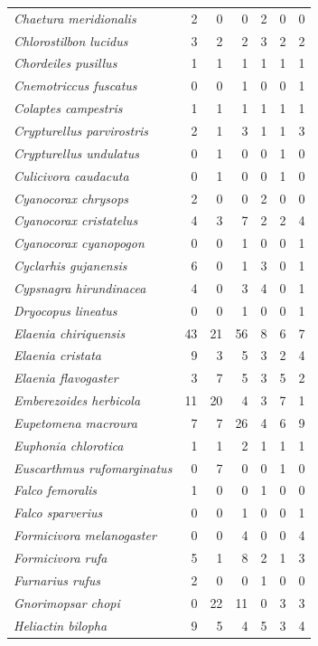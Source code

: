 \documentclass[12pt, A4]{article}
\begin{document}
\begin{longtable}{>{\itshape}lrrrrrr}
    Chaetura meridionalis & 2 & 0 & 0 & 2 & 0 & 0 \\ 
    Chlorostilbon lucidus & 3 & 2 & 2 & 3 & 2 & 2 \\ 
    Chordeiles pusillus & 1 & 1 & 1 & 1 & 1 & 1 \\ 
    Cnemotriccus fuscatus & 0 & 0 & 1 & 0 & 0 & 1 \\ 
    Colaptes campestris & 1 & 1 & 1 & 1 & 1 & 1 \\ 
    Crypturellus parvirostris & 2 & 1 & 3 & 1 & 1 & 3 \\ 
    Crypturellus undulatus & 0 & 1 & 0 & 0 & 1 & 0 \\ 
    Culicivora caudacuta & 0 & 1 & 0 & 0 & 1 & 0 \\ 
    Cyanocorax chrysops & 2 & 0 & 0 & 2 & 0 & 0 \\ 
    Cyanocorax cristatelus & 4 & 3 & 7 & 2 & 2 & 4 \\ 
    Cyanocorax cyanopogon & 0 & 0 & 1 & 0 & 0 & 1 \\ 
    Cyclarhis gujanensis & 6 & 0 & 1 & 3 & 0 & 1 \\ 
    Cypsnagra hirundinacea & 4 & 0 & 3 & 4 & 0 & 1 \\ 
    Dryocopus lineatus & 0 & 0 & 1 & 0 & 0 & 1 \\ 
    Elaenia chiriquensis & 43 & 21 & 56 & 8 & 6 & 7 \\ 
    Elaenia cristata & 9 & 3 & 5 & 3 & 2 & 4 \\ 
    Elaenia flavogaster & 3 & 7 & 5 & 3 & 5 & 2 \\ 
    Emberezoides herbicola & 11 & 20 & 4 & 3 & 7 & 1 \\ 
    Eupetomena macroura & 7 & 7 & 26 & 4 & 6 & 9 \\ 
    Euphonia chlorotica & 1 & 1 & 2 & 1 & 1 & 1 \\ 
    Euscarthmus rufomarginatus & 0 & 7 & 0 & 0 & 1 & 0 \\ 
    Falco femoralis & 1 & 0 & 0 & 1 & 0 & 0 \\ 
    Falco sparverius & 0 & 0 & 1 & 0 & 0 & 1 \\ 
    Formicivora melanogaster & 0 & 0 & 4 & 0 & 0 & 4 \\ 
    Formicivora rufa & 5 & 1 & 8 & 2 & 1 & 3 \\ 
    Furnarius rufus & 2 & 0 & 0 & 1 & 0 & 0 \\ 
    Gnorimopsar chopi & 0 & 22 & 11 & 0 & 3 & 3 \\ 
    Heliactin bilopha & 9 & 5 & 4 & 5 & 3 & 4 \\ 

\end{longtable}
\end{document}
